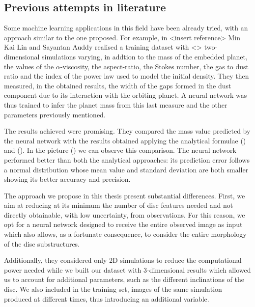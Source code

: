 \documentclass[a4paper,10pt]{report}
\begin{document}
\subsection{Previous attempts in literature}

Some machine learning applications in this field have been already tried, 
with an approach similar to the one proposed. For example, in <insert reference>
Min Kai Lin and Sayantan Auddy realised a training dataset with <> two-dimensional simulations varying, in addtion to the mass of the embedded planet, the values of the $\alpha$-viscosity, the aspect-ratio, the Stokes number, the gas to dust ratio and the index of the power law used to model 
the initial density. 
They then measured, in the obtained results, the width of the gaps formed in the
dust component due to its interaction with the orbiting planet. A neural network
was thus trained to infer the planet mass from this last measure and the other parameters previously mentioned.

The results achieved were promising. They compared the mass value predicted by the neural network
with the results obtained applying the analytical formulae () and ().
In the picture () we can observe this comparison.
The neural network performed better than both the analytical approaches: its prediction error
follows a normal distribution whose mean value and standard deviation are both smaller showing its
better accuracy and precision.

The approach we propose in this thesis present substantial differences. 
First, we aim at reducing at its minimum the number of disc features needed and not 
directly obtainable, with low uncertainty, from observations.
For this reason, we opt for a neural network designed to receive the entire
observed image as input which also allows, as a fortunate consequence, to consider the entire morphology of the disc substructures.

Additionally, they considered only 2D simulations to reduce the computational power needed
while we built our dataset with 3-dimensional results which allowed us to account for additional parameters, such as the different 
inclinations of the disc. We also included in the training set, images of the same simulation
produced at different times, thus introducing an additional variable.
\end{document}
